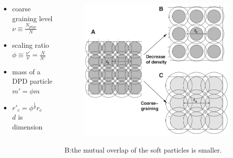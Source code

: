 \documentclass{beamer}
\begin{document}
\begin{frame}
\begin{columns}
\begin{column}{.5\textwidth}
    \begin{itemize}
        \item coarse graining level $\nu \equiv \frac{N_{phys}}{N}$
        \item scaling ratio $\phi \equiv \frac{\nu'}{\nu} = \frac{N}{N'}$
        \item mass of a DPD particle $m' = \phi m$
        \item $r'_c = \phi^{\frac{1}{d}}r_c$ \\
            $d$ is dimension
    \end{itemize}
\end{column}
\begin{column}{.5\textwidth}
    \begin{figure}
        \includegraphics[width=\textwidth]{rc.png}
    \end{figure}
    B:\@ the mutual overlap of the soft particles is smaller.
\end{column}
\end{columns}
\end{frame}
\end{document}
